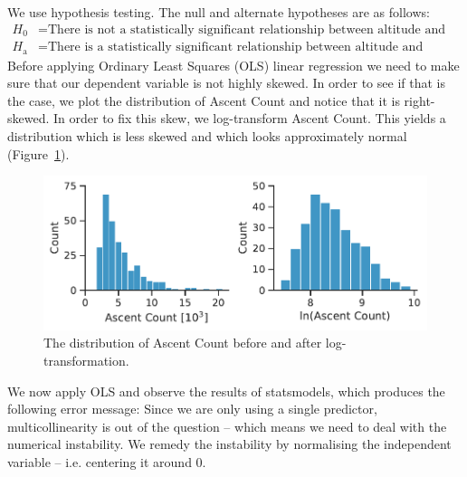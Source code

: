 \documentclass[11pt,a4paper]{article}
\begin{document}
We use hypothesis testing. The null and alternate hypotheses are as follows:
\begin{align*}
    H_0 &= \text{There is not a statistically significant relationship between altitude and number of ascents.}\\
    H_\text{a} &= \text{There is a statistically significant relationship between altitude and number of ascents.}
\end{align*}
Before applying Ordinary Least Squares (OLS) linear regression we need to make sure that our dependent variable is not highly skewed. In order to see if that is the case, we plot the distribution of Ascent Count and notice that it is right-skewed. In order to fix this skew, we log-transform Ascent Count. This yields a distribution which is less skewed and which looks approximately normal (Figure~\ref{fds-project-template:fig:ascent_count_distribution}).
\begin{figure} [h!]
  \centering
  \includegraphics{report/ascent_count_distribution.pdf}
  \caption{The distribution of Ascent Count before and after log-transformation.}
  \label{fds-project-template:fig:ascent_count_distribution}
\end{figure}
We now apply OLS and observe the results of statsmodels, which produces the following error message:  Since we are only using a single predictor, multicollinearity is out of the question – which means we need to deal with the numerical instability. We remedy the instability by normalising the independent variable – i.e. centering it around 0. \\ \\
\end{document}
